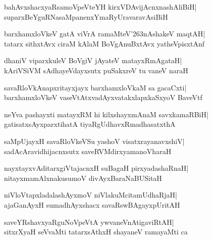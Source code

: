 \documentclass[twoside,12pt,openright]{book}
\def\S{\char'263}
\newcounter{shloka}[chapter]
\begin{document}
\begin{shloka}%
bahAvxshacxyaRsamoVpeVteYH kirxVDAvijAcnxnashAliBiH|\\
suparxBeYguRNasaMpanenxYmaRyUravaravAsiBiH
\end{shloka}

\begin{shloka}%
barxhamxloVkeV gatA viVrA ramaMteV\S nAshakeV maqtAH|\\
tatarx sithxtAvx ciraM kAlaM BoVgAnuBxtAvx yatheVpisxtAnf
\end{shloka}

\begin{shloka}%
dhaniV viparxkuleV BoVgiV jAyateV matayxRmAgataH|\\
kAriVSiVM sAdhayeVdayxsutx puSakxreV tu vaneV naraH
\end{shloka}

\begin{shloka}%
savaRloVkAnapxritayxjayx barxhamxloVkaM sa gacaCxti|\\
barxhamxloVkeV vaseVtAtxvadAyxvatakxlapxkaSxyoV BaveVtf
\end{shloka}

\begin{shloka}%
neYva pashayxti matayxRM hi kilxshayxmAnaM savxkamaRBiH|\\
gatisatxsAyxparxtihatA tiyaRgUdhavxRmadhasatxthA
\end{shloka}

\begin{shloka}%
saMpUjayxH savaRloVkeVSu yashoV visatxrayanavxshiV|\\
sadAcAravidhijacnxsutx saveRVMdirxyamanoVharaH
\end{shloka}

\begin{shloka}%
nayxtayxvAditarxgiVtajacnxH suBagaH pirxyadashaRnaH|\\
nitayxmamAlxnakusumoV divAyxBaraNaBUSitaH
\end{shloka}

\begin{shloka}%
niVloVtapxladalashAyxmoV niVlakuMcitamUdhaRjaH|\\
ajaGanAyxH sumadhAyxshacx savaRswBAgayxpUritAH
\end{shloka}

\begin{shloka}%
saveYRshavxyaRguNoVpeVtA ywvaneVnAtigaviRtAH|\\
sitxrXyaH seVvaMti tatarxsAthxH shayaneV ramayaMti ca
\end{shloka}
\end{document}
